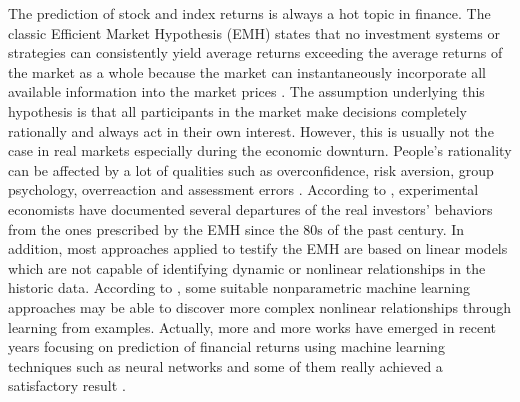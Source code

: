 \documentclass{article}
\begin{document}
\noindent The prediction of stock and index returns is always a hot topic in finance. The classic Efficient Market Hypothesis (EMH) states that no investment systems or strategies can consistently yield average returns exceeding the average returns of the market as a whole because the market can instantaneously incorporate all available information into the market prices \cite{pantazopoulos1998financial} \cite{lo2005reconciling}. The assumption underlying this hypothesis is that all participants in the market make decisions completely rationally and always act in their own interest. However, this is usually not the case in real markets especially during the economic downturn. People’s rationality can be affected by a lot of qualities such as overconfidence, risk aversion, group psychology, overreaction and assessment errors \cite{corazza2015q}. According to \cite{bertoluzzo2014reinforcement}, experimental economists have documented several departures of the real investors’ behaviors from the ones prescribed by the EMH since the 80s of the past century. In addition, most approaches applied to testify the EMH are based on linear models which are not capable of identifying dynamic or nonlinear relationships in the historic data. According to \cite{chenoweth1996embedding}, some suitable nonparametric machine learning approaches may be able to discover more complex nonlinear relationships through learning from examples. Actually, more and more works have emerged in recent years focusing on prediction of financial returns using machine learning techniques such as neural networks and some of them really achieved a satisfactory result \cite{pantazopoulos1998financial} \cite{chenoweth1996embedding}.
\end{document}
